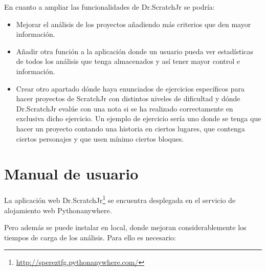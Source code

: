 \documentclass[a4paper, 12pt]{book}
\begin{document}
En cuanto a ampliar las funcionalidades de Dr.ScratchJr se podría:
\begin{itemize}
    \item Mejorar el análisis de los proyectos añadiendo más criterios que den mayor información.
    \item Añadir otra función a la aplicación donde un usuario pueda ver estadísticas de todos los análisis que tenga almacenados y así tener mayor control e información.
    \item Crear otro apartado dónde haya enunciados de ejercicios específicos para hacer proyectos de ScratchJr con distintos niveles de dificultad y dónde Dr.ScratchJr evalúe con una nota si se ha realizado correctamente en exclusiva dicho ejercicio. 
    Un ejemplo de ejercicio sería uno donde se tenga que hacer un proyecto contando una historia en ciertos lugares, que contenga ciertos personajes y que usen mínimo ciertos bloques.
\end{itemize}



\cleardoublepage
\appendix
\chapter{Manual de usuario}
\label{app:manual}

La aplicación web Dr.ScratchJr\footnote{\url{http://spereztfg.pythonanywhere.com/}} se encuentra desplegada en el servicio de alojamiento web Pythonanywhere.

Pero además se puede instalar en local, donde mejoran considerablemente los tiempos de carga de los análisis.
Para ello es necesario:
\end{document}
